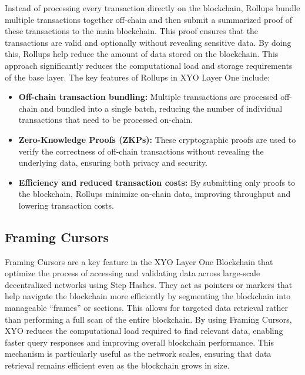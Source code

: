 \documentclass{article}
\begin{document}
Instead of processing every transaction directly on the blockchain, Rollups
bundle multiple transactions together off-chain and then submit a summarized
proof of these transactions to the main blockchain. This proof ensures that the
transactions are valid and optionally without revealing sensitive data. By
doing this, Rollups help reduce the amount of data stored on the blockchain.
This approach significantly reduces the computational load and storage
requirements of the base layer. The key features of Rollups in XYO Layer One
include:
\begin{itemize}
    \item \textbf{Off-chain transaction bundling:} Multiple transactions are processed off-chain and bundled into a single batch, reducing the number of individual transactions that need to be processed on-chain.
    \item \textbf{Zero-Knowledge Proofs (ZKPs):} These cryptographic proofs are used to verify the correctness of off-chain transactions without revealing the underlying data, ensuring both privacy and security.
    \item \textbf{Efficiency and reduced transaction costs:} By submitting only proofs to the blockchain, Rollups minimize on-chain data, improving throughput and lowering transaction costs.
\end{itemize}

\subsection{Framing Cursors}
Framing Cursors are a key feature in the XYO Layer One Blockchain that optimize
the process of accessing and validating data across large-scale decentralized
networks using Step Hashes. They act as pointers or markers that help navigate
the blockchain more efficiently by segmenting the blockchain into manageable
“frames” or sections. This allows for targeted data retrieval rather than
performing a full scan of the entire blockchain. By using Framing Cursors, XYO
reduces the computational load required to find relevant data, enabling faster
query responses and improving overall blockchain performance. This mechanism is
particularly useful as the network scales, ensuring that data retrieval remains
efficient even as the blockchain grows in size.
\end{document}
